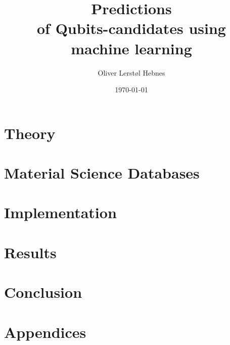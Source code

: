 \documentclass[twoside, english, notitlepage, 12pt]{uiofysmaster}
\author{Oliver Lerstøl Hebnes}
\title{Predictions\\
of Qubits-candidates
using\\ machine learning
}
\date{\today}
\begin{document}
\hypersetup{pageanchor=false}
\frontmatter
    \maketitle



    \tableofcontents
    \newpage

\mainmatter

    \part{Theory}
        
        

    \part{Material Science Databases}


    \part{Implementation}


    \part{Results}


    \part{Conclusion}


    \part{Appendices}
    \appendix

        

        \nocite{*}
        \printbibliography%
\end{document}
